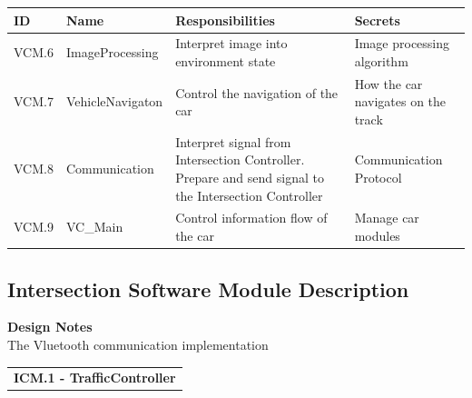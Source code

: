 \documentclass [10pt]{article}
\begin{document}
\begin{longtable}{ |p{ }  | p{ } |  p{ } |  p{ } |}  \hline
    
    \textbf{ID} & \textbf{Name} &  \textbf{Responsibilities} & \textbf{Secrets} \\ \hline
    
    \cellcolor{tableCell}VCM.6  &\cellcolor{tableCell}ImageProcessing &\cellcolor{tableCell}Interpret image into environment state &\cellcolor{tableCell}Image processing algorithm  \\ \hline
    
    VCM.7 & VehicleNavigaton & Control the navigation of the car & How the car navigates on the track \\ \hline
    
    \cellcolor{tableCell}VCM.8  & \cellcolor{tableCell}Communication & \cellcolor{tableCell}Interpret signal from Intersection Controller. Prepare and send signal to the Intersection Controller & \cellcolor{tableCell}Communication Protocol \\ \hline

    VCM.9 & VC\_Main & Control information flow of the car & Manage car modules \\ \hline
    
\end{longtable}

\subsection{Intersection Software Module Description}
\textbf{Design Notes} \\
The Vluetooth communication implementation  \\

\begin{longtable}{p{}}
\rowcolor{tableCell}\textbf{ICM.1 - TrafficController} \\
\end{longtable}
\end{document}
